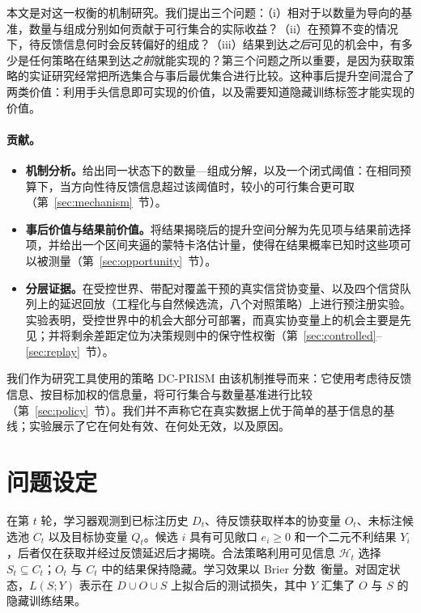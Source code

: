 \documentclass[runningheads]{llncs}
\begin{document}
本文是对这一权衡的机制研究。我们提出三个问题：（i）相对于以数量为导向的基准，数量与组成分别如何贡献于可行集合的实际收益？（ii）在预算不变的情况下，待反馈信息何时会反转偏好的组成？（iii）结果到达\emph{之后}可见的机会中，有多少是任何策略在结果到达\emph{之前}就能实现的？第三个问题之所以重要，是因为获取策略的实证研究经常把所选集合与事后最优集合进行比较。这种事后提升空间混合了两类价值：利用手头信息即可实现的价值，以及需要知道隐藏训练标签才能实现的价值。

\paragraph{贡献。}
\begin{itemize}
\item \textbf{机制分析。}给出同一状态下的数量—组成分解，以及一个闭式阈值：在相同预算下，当方向性待反馈信息超过该阈值时，较小的可行集合更可取（第~\ref{sec:mechanism}~节）。
\item \textbf{事后价值与结果前价值。}将结果揭晓后的提升空间分解为先见项与结果前选择项，并给出一个区间夹逼的蒙特卡洛估计量，使得在结果概率已知时这些项可以被测量（第~\ref{sec:opportunity}~节）。
\item \textbf{分层证据。}在受控世界、带配对覆盖干预的真实信贷协变量、以及四个信贷队列上的延迟回放（工程化与自然候选流，八个对照策略）上进行预注册实验。实验表明，受控世界中的机会大部分可部署，而真实协变量上的机会主要是先见；并将剩余差距定位为决策规则中的保守性权衡（第~\ref{sec:controlled}--\ref{sec:replay}~节）。
\end{itemize}
我们作为研究工具使用的策略 DC-PRISM 由该机制推导而来：它使用考虑待反馈信息、按目标加权的信息量，将可行集合与数量基准进行比较（第~\ref{sec:policy}~节）。我们并不声称它在真实数据上优于简单的基于信息的基线；实验展示了它在何处有效、在何处无效，以及原因。

\section{问题设定}
\label{sec:setting}
在第 $t$ 轮，学习器观测到已标注历史 $D_t$、待反馈获取样本的协变量 $O_t$、未标注候选池 $C_t$ 以及目标协变量 $Q_t$。候选 $i$ 具有可见敞口 $e_i\geq0$ 和一个二元不利结果 $Y_i$，后者仅在获取并经过反馈延迟后才揭晓。合法策略利用可见信息 $\mathcal H_t$ 选择 $S_t\subseteq C_t$；$O_t$ 与 $C_t$ 中的结果保持隐藏。学习效果以 Brier 分数~\cite{brier1950verification}衡量。对固定状态，$L(S;Y)$ 表示在 $D\cup O\cup S$ 上拟合后的测试损失，其中 $Y$ 汇集了 $O$ 与 $S$ 的隐藏训练结果。
\end{document}
